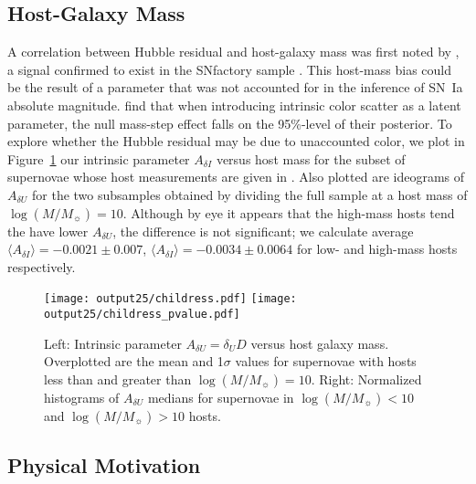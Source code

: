 \documentclass{aastex61}   	%
\begin{document}
\subsection{Host-Galaxy Mass}
A correlation between Hubble residual and host-galaxy mass
was first noted by \citet{2010ApJ...715..743K,2010MNRAS.406..782S}, a signal confirmed to exist in the SNfactory
sample \citep{2013ApJ...770..108C}.
This host-mass bias could be the result of a parameter that was not accounted for in the inference of SN~Ia absolute magnitude.
\citet{2016arXiv160904470M} find that when introducing intrinsic color scatter as a latent parameter, the null mass-step effect falls on the 95\%-level of their posterior.
To explore whether the Hubble residual may be due to unaccounted color,
we plot in Figure~\ref{childress:fig} our intrinsic parameter  $A_{\delta I}$  versus host mass 
\color{purple}
for the subset of supernovae whose host measurements are given in \citet{2013ApJ...770..108C}.
Also plotted  are ideograms of $A_{\delta U}$ for the two subsamples obtained by dividing the full sample at a host mass of  $\log{(M/M_\sun)}=10$.
Although by eye it appears that the high-mass hosts tend the have lower $A_{\delta U}$, the difference is
not significant; we calculate  average
$\langle A_{\delta I} \rangle=   -0.0021 \pm    0.007$,
$\langle A_{\delta I} \rangle= -0.0034 \pm    0.0064$ 
for low- and high-mass hosts respectively. 

\begin{figure}[htbp] %
   \centering
   \texttt{[image: output25/childress.pdf]}
   \texttt{[image: output25/childress\_pvalue.pdf]}
      \caption{Left: Intrinsic parameter $A_{\delta U}=\delta_U D$  versus host galaxy mass. Overplotted are the mean and 1$\sigma$ values for supernovae with hosts
      less than and greater than  $\log{(M/M_\sun)}=10$.
Right: Normalized histograms of  $A_{\delta U}$ medians for supernovae in $\log{(M/M_\sun)}<10$ and $\log{(M/M_\sun)}>10$ hosts. 
   \label{childress:fig}}
\end{figure}

\subsection{Physical Motivation}
\end{document}
